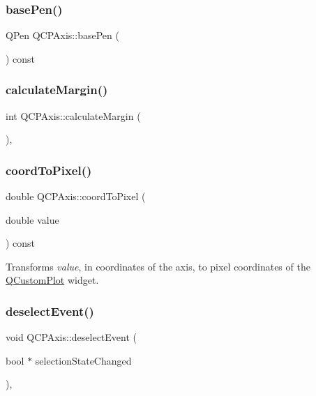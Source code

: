 \subsubsection{\texorpdfstring{basePen()}{basePen()}}
{\footnotesize\ttfamily Q\+Pen Q\+C\+P\+Axis\+::base\+Pen (\begin{DoxyParamCaption}{ }\end{DoxyParamCaption}) const\hspace{0.3cm}{\ttfamily [inline]}}

\mbox{\label{class_q_c_p_axis_a47bdb0a55de6759489ee47665199aebb}} 
\subsubsection{\texorpdfstring{calculateMargin()}{calculateMargin()}}
{\footnotesize\ttfamily int Q\+C\+P\+Axis\+::calculate\+Margin (\begin{DoxyParamCaption}{ }\end{DoxyParamCaption})\hspace{0.3cm}{\ttfamily [protected]}, {\ttfamily [virtual]}}

\mbox{\label{class_q_c_p_axis_af15d1b3a7f7e9b53d759d3ccff1fe4b4}} 
\subsubsection{\texorpdfstring{coordToPixel()}{coordToPixel()}}
{\footnotesize\ttfamily double Q\+C\+P\+Axis\+::coord\+To\+Pixel (\begin{DoxyParamCaption}\item[{double}]{value }\end{DoxyParamCaption}) const}

Transforms {\itshape value}, in coordinates of the axis, to pixel coordinates of the \mbox{\hyperlink{class_q_custom_plot}{Q\+Custom\+Plot}} widget. \mbox{\label{class_q_c_p_axis_a5bc1f8a8d0fbc7658eba70c80279ed31}} 
\subsubsection{\texorpdfstring{deselectEvent()}{deselectEvent()}}
{\footnotesize\ttfamily void Q\+C\+P\+Axis\+::deselect\+Event (\begin{DoxyParamCaption}\item[{bool $\ast$}]{selection\+State\+Changed }\end{DoxyParamCaption})\hspace{0.3cm}{\ttfamily [protected]}, {\ttfamily [virtual]}}



